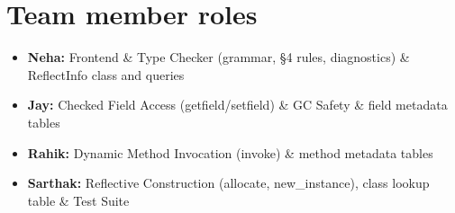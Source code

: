 \section{Team member roles}
\begin{itemize}
  \item[] \textbf{Neha:} Frontend \& Type Checker (grammar, \S4 rules, diagnostics)
    \& ReflectInfo class and queries
  \item[] \textbf{Jay:} Checked Field Access (getfield/setfield) \& GC Safety
    \& field metadata tables
  \item[] \textbf{Rahik:} Dynamic Method Invocation (invoke) \& method metadata
    tables
  \item[] \textbf{Sarthak:} Reflective Construction (allocate, new\_instance),
    class lookup table \& Test Suite
\end{itemize}

